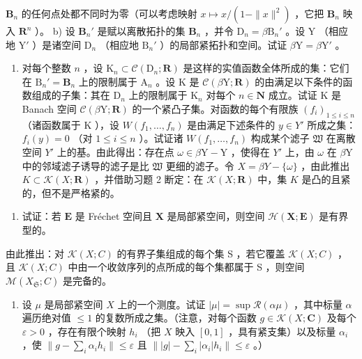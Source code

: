 \(\mathbf{B}_n\) 的任何点处都不同时为零（可以考虑映射 \(x \mapsto x / (1 - \|x\|^2)\) ，它把 \(\mathbf{B}_n\) 映入 \(\mathbf{R}^n\) ）。 b) 设 \(\mathbf{B}_n'\) 是赋以离散拓扑的集 \(\mathbf{B}_n\) ，并令 \(\mathrm{D}_n = \beta \mathrm{B}_n'\) 。设 Y （相应地 \(\mathrm{Y}'\) ）是诸空间 \(\mathrm{D}_n\) （相应地 \(\mathrm{B}_n'\) ）的局部紧拓扑和空间。试证 \(\beta \mathrm{Y} = \beta \mathrm{Y}'\) 。

\begin{enumerate}
\def\labelenumi{\alph{enumi})}
\setcounter{enumi}{2}
\tightlist
\item
  对每个整数 \(n\) ，设 \(\mathrm{K}_n \subset \mathcal{C}(\mathrm{D}_n; \mathbf{R})\) 是这样的实值函数全体所成的集：它们在 \(\mathrm{B}_n' = \mathbf{B}_n\) 上的限制属于 \(\mathrm{A}_n\) 。设 \(\mathrm{K}\) 是 \(\mathcal{C}(\beta\mathrm{Y}; \mathbf{R})\) 的由满足以下条件的函数组成的子集：其在 \(\mathrm{D}_n\) 上的限制属于 \(\mathrm{K}_n\) 对每个 \(n \in \mathbf{N}\) 成立。试证 \(\mathrm{K}\) 是 Banach 空间 \(\mathcal{C}(\beta\mathrm{Y}; \mathbf{R})\) 的一个紧凸子集。对函数的每个有限族 \((f_i)_{1 \leqslant i \leqslant n}\) （诸函数属于 \(\mathrm{K}\) ），设 \(W(f_1, \ldots, f_n)\) 是由满足下述条件的 \(y \in Y'\) 所成之集：\(f_i(y) = 0\) （对 \(1 \leqslant i \leqslant n\) ）。试证诸 \(W(f_1, \ldots, f_n)\) 构成某个滤子 \(\mathfrak{W}\) 在离散空间 \(Y'\) 上的基。由此得出：存在点 \(\omega \in \beta\mathrm{Y} - \mathrm{Y}\) ，使得在 \(Y'\) 上，由 \(\omega\) 在 \(\beta\mathrm{Y}\) 中的邻域滤子诱导的滤子是比 \(\mathfrak{W}\) 更细的滤子。令 \(X = \beta Y - \{\omega\}\) ，由此推出 \(K \subset \mathcal{K}(X; \mathbf{R})\) ，并借助习题 2 断定：在 \(\mathcal{K}(X; \mathbf{R})\) 中，集 \(K\) 是凸的且紧的，但不是严格紧的。
\end{enumerate}

\begin{enumerate}
\def\labelenumi{\arabic{enumi})}
\setcounter{enumi}{4}
\tightlist
\item
  试证：若 \(\mathbf{E}\) 是 Fréchet 空间且 \(\mathbf{X}\) 是局部紧空间，则空间 \(\mathcal{H}(\mathbf{X};\mathbf{E})\) 是有界型的。
\end{enumerate}

由此推出：对 \(\mathcal{K}(X;C)\) 的有界子集组成的每个集 S ，若它覆盖 \(\mathcal{K}(X;C)\) ，且 \(\mathcal{K}(X;C)\) 中由一个收敛序列的点所成的每个集都属于 S ，则空间 \(\mathcal{M}(X_{\mathfrak{S}};C)\) 是完备的。

\begin{enumerate}
\def\labelenumi{\arabic{enumi})}
\setcounter{enumi}{5}
\tightlist
\item
  设 \(\mu\) 是局部紧空间 \(X\) 上的一个测度。试证 \(|\mu| = \sup \mathcal{R}(\alpha \mu)\) ，其中标量 \(\alpha\) 遍历绝对值 \(\leqslant 1\) 的复数所成之集。（注意，对每个函数 \(g \in \mathcal{K}(X; \mathbf{C})\) 及每个 \(\varepsilon > 0\) ，存在有限个映射 \(h_i\) （把 \(X\) 映入 \([0,1]\) ，具有紧支集）以及标量 \(\alpha_i\) ，使 \(\| g - \sum_{i} \alpha_i h_i \| \leqslant \varepsilon\) 且 \(\| |g| - \sum_{i} |\alpha_i| h_i \| \leqslant \varepsilon\) 。）
\end{enumerate}

